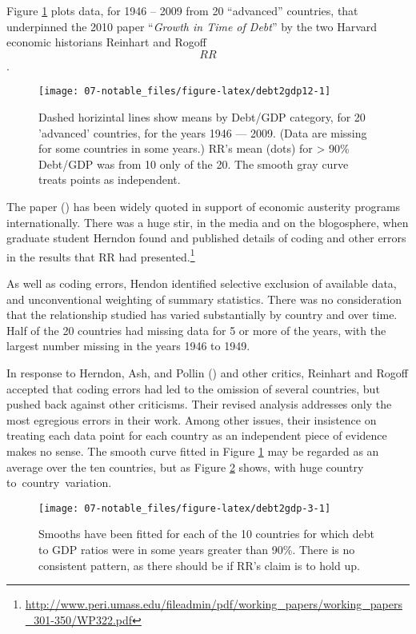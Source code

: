 \documentclass[
  10ptls,
  b5paper]{book}
\begin{document}
Figure \ref{fig:debt2gdp12} plots data, for 1946 -- 2009 from 20 ``advanced'' countries, that underpinned the 2010 paper ``\emph{Growth in Time of Debt}'' by the two Harvard economic historians Reinhart and Rogoff \[RR\].

\begin{figure}[H]

{\centering \texttt{[image: 07-notable\_files/figure-latex/debt2gdp12-1]} 

}

\caption{Dashed horizintal lines show means by Debt/GDP category, 
for 20 'advanced' countries, for the years 1946 --- 2009.
(Data are missing for some countries in some years.)
RR's mean (dots) for > 90\% Debt/GDP was from 10 only of the 20. 
The smooth gray curve treats points as independent.}\label{fig:debt2gdp12}
\end{figure}

The paper () has been widely quoted in support of economic austerity programs internationally. There was a huge stir, in the media and on the blogosphere, when graduate student Herndon found and published details of coding and other errors in the results that RR had presented.\footnote{\url{http://www.peri.umass.edu/fileadmin/pdf/working_papers/working_papers_301-350/WP322.pdf}}

As well as coding errors, Hendon identified selective exclusion of available data, and unconventional weighting of summary statistics. There was no consideration that the relationship studied has varied substantially by country and over time. Half of the 20 countries had missing data for 5 or more of the years, with the largest number missing in the years 1946 to 1949.

In response to Herndon, Ash, and Pollin () and other critics, Reinhart and Rogoff accepted that coding errors had led to the omission of several countries, but pushed back against other criticisms. Their revised analysis addresses only the most egregious errors in their work. Among other issues, their insistence on treating each data point for each country as an independent piece of evidence makes no sense. The smooth curve fitted in Figure \ref{fig:debt2gdp12} may be regarded as an average over the ten countries, but as Figure \ref{fig:debt2gdp-3} shows, with huge country to~country~variation.

\begin{figure}[H]

{\centering \texttt{[image: 07-notable\_files/figure-latex/debt2gdp-3-1]} 

}

\caption{Smooths have been fitted for each of the 10 countries
for which debt to GDP ratios were in some years greater than 90\%.
There is no consistent pattern, as there should be if RR's claim
is to hold up.}\label{fig:debt2gdp-3}
\end{figure}
\end{document}
